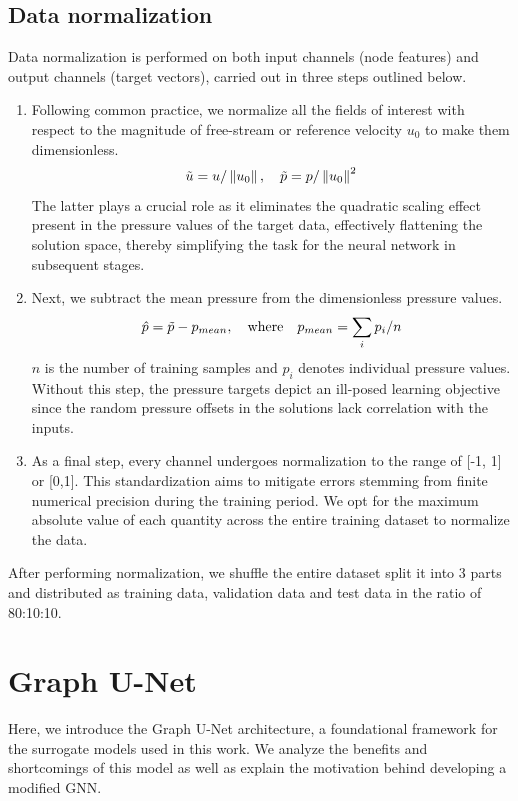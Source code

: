 \subsection{Data normalization}
Data normalization is performed on both input channels (node features) and output channels (target vectors), carried out in three steps outlined below.
\begin{enumerate}
\item Following common practice, we normalize all the fields of interest with respect to the magnitude of free-stream or reference velocity $u_0$ to make them dimensionless. 
\begin{equation}
    \Tilde{u}=u /\left\|u_0\right\|, \quad \Tilde{p}=p /\left\|u_0\right\|^2
\end{equation}
The latter plays a crucial role as it eliminates the quadratic scaling effect present in the pressure values of the target data, effectively flattening the solution space, thereby simplifying the task for the neural network in subsequent stages.
\item Next, we subtract the mean pressure from the dimensionless pressure values. 
\begin{equation}
\hat{p} = \Tilde{p} - p_{mean} , \quad \text{where} \quad p_{mean} = \sum_i p_i / n
\end{equation}
$n$ is the number of training samples and $p_i$ denotes individual pressure values. Without this step, the pressure targets depict an ill-posed learning objective since the random pressure offsets in the solutions lack correlation with the inputs.
\item As a final step, every channel undergoes normalization to the range of [-1, 1] or [0,1]. This standardization aims to mitigate errors stemming from finite numerical precision during the training period. We opt for the maximum absolute value of each quantity across the entire training dataset to normalize the data. 
\end{enumerate}
After performing normalization, we shuffle the entire dataset split it into 3 parts and distributed as training data, validation data and test data in the ratio of 80:10:10. 
\section{Graph U-Net}
Here, we introduce the Graph U-Net architecture, a foundational framework for the surrogate models used in this work. We analyze the benefits and shortcomings of this model as well as explain the motivation behind developing a modified GNN.

